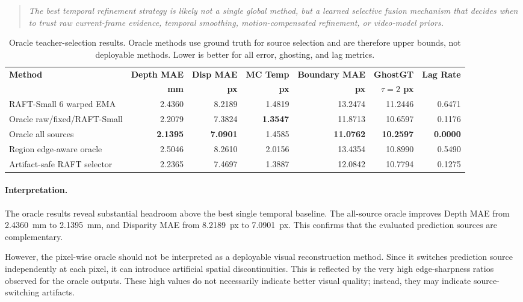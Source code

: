 \documentclass[11pt,a4paper]{article}
\begin{document}
\begin{quote}
\emph{The best temporal refinement strategy is likely not a single global method, but a learned selective fusion mechanism that decides when to trust raw current-frame evidence, temporal smoothing, motion-compensated refinement, or video-model priors.}
\end{quote}
\begin{table}[t]
\centering
\scriptsize
\caption{Oracle teacher-selection results. Oracle methods use ground truth for source selection and are therefore upper bounds, not deployable methods. Lower is better for all error, ghosting, and lag metrics.}
\label{tab:oracle-selection-results}
\begin{tabular}{lrrrrrr}
\toprule
\textbf{Method} &
\textbf{Depth MAE} &
\textbf{Disp MAE} &
\textbf{MC Temp} &
\textbf{Boundary MAE} &
\textbf{GhostGT} &
\textbf{Lag Rate} \\
&
\textbf{mm} &
\textbf{px} &
\textbf{px} &
\textbf{px} &
\textbf{$\tau=2$ px} &
\\
\midrule
RAFT-Small 6 warped EMA &
2.4360 & 8.2189 & 1.4819 & 13.2474 & 11.2446 & 0.6471 \\
Oracle raw/fixed/RAFT-Small &
2.2079 & 7.3824 & \textbf{1.3547} & 11.8713 & 10.6597 & 0.1176 \\
Oracle all sources &
\textbf{2.1395} & \textbf{7.0901} & 1.4585 & \textbf{11.0762} & \textbf{10.2597} & \textbf{0.0000} \\
Region edge-aware oracle &
2.5046 & 8.2610 & 2.0156 & 13.4354 & 10.8990 & 0.5490 \\
Artifact-safe RAFT selector &
2.2365 & 7.4697 & 1.3887 & 12.0842 & 10.7794 & 0.1275 \\
\bottomrule
\end{tabular}
\end{table}
\paragraph{Interpretation.}
The oracle results reveal substantial headroom above the best single temporal baseline. The all-source oracle improves Depth MAE from \SI{2.4360}{mm} to \SI{2.1395}{mm}, and Disparity MAE from \SI{8.2189}{px} to \SI{7.0901}{px}. This confirms that the evaluated prediction sources are complementary.

However, the pixel-wise oracle should not be interpreted as a deployable visual reconstruction method. Since it switches prediction source independently at each pixel, it can introduce artificial spatial discontinuities. This is reflected by the very high edge-sharpness ratios observed for the oracle outputs. These high values do not necessarily indicate better visual quality; instead, they may indicate source-switching artifacts.
\end{document}
